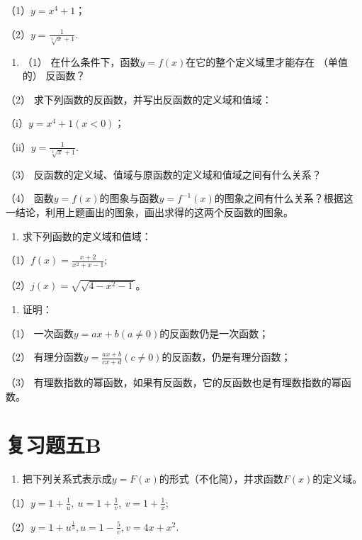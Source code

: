 （1）\(y = x^4 + 1\)；

（2）\(y = \frac{1}{\sqrt[3]{x} + 1}.\)

\begin{enumerate}[start=8]
\item
  （1） 在什么条件下，函数\(y = f(x)\)在它的整个定义域里才能存在
  （单值的） 反函数？
\end{enumerate}

（2） 求下列函数的反函数，并写出反函数的定义域和值域：

（i）\(y = x^4 + 1 (x < 0)\)；

（ii）\(y=\frac{1}{\sqrt[3]{x}+1}.\)

（3） 反函数的定义域、值域与原函数的定义域和值域之间有什么关系？

（4）
函数\(y = f(x)\)的图象与函数\(y = f^{-1}(x)\)的图象之间有什么关系？根据这一结论，利用上题画出的图象，画出求得的这两个反函数的图象。

\begin{enumerate}[start=7]
\item
  求下列函数的定义域和值域：
\end{enumerate}

（1）\(f(x)=\frac{x+2}{x^{2}+x-1};\)

（2）\(j(x)=\sqrt{\sqrt{4-x^{2}-1}}\)。

\begin{enumerate}[start=8]
\item
  证明：
\end{enumerate}

（1） 一次函数\(y = ax + b (a \neq 0)\)的反函数仍是一次函数；

（2）
有理分函数\(y = \frac{ax + b}{cx + d} (c \neq 0)\)的反函数，仍是有理分函数；

（3）
有理数指数的幂函数，如果有反函数，它的反函数也是有理数指数的幂函数。

\section{复习题五B}

\begin{enumerate}
\item
  把下列关系式表示成\(y = F(x)\)的形式（不化简），并求函数\(F(x)\)的定义域。
\end{enumerate}

（1）\(y=1+\frac1u,\ u=1+\frac1v,\ v=1+\frac1x;\)

（2）\(y = 1 + u^{\frac{1}{3}}, u = 1 - \frac{5}{v}, v = 4x + x^{2}.\)


